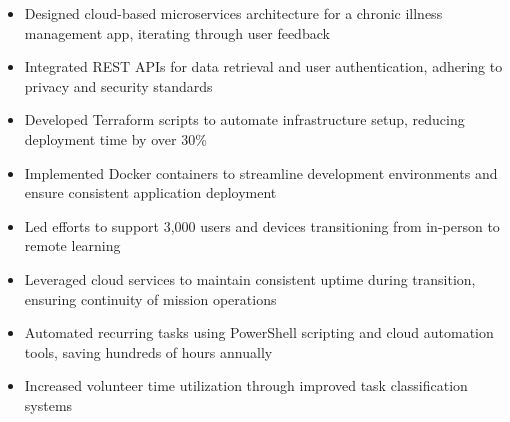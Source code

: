 \par\smallskip
\begin{minipage}{13.75cm}
  \begin{minipage}{6.5cm}
    \begin{itemize}
      \item Designed cloud-based microservices architecture for a chronic illness management app, iterating through user feedback
      \item Integrated REST APIs for data retrieval and user authentication, adhering to privacy and security standards
    \end{itemize}
  \end{minipage}
  \hfill
  \begin{minipage}{6.5cm}
    \begin{itemize}
      \item Developed Terraform scripts to automate infrastructure setup, reducing deployment time by over 30\%
      \item Implemented Docker containers to streamline development environments and ensure consistent application deployment
    \end{itemize}
  \end{minipage}
\end{minipage}
\par\smallskip
\divider

\par\smallskip
\begin{minipage}{13.75cm}
  \begin{minipage}{6.5cm}
    \begin{itemize}
      \item Led efforts to support 3,000 users and devices transitioning from in-person to remote learning
      \item Leveraged cloud services to maintain consistent uptime during transition, ensuring continuity of mission operations
    \end{itemize}
  \end{minipage}
  \hfill
  \begin{minipage}{6.5cm}
    \begin{itemize}
      \item Automated recurring tasks using PowerShell scripting and cloud automation tools, saving hundreds of hours annually
      \item Increased volunteer time utilization through improved task classification systems
    \end{itemize}
  \end{minipage}
\end{minipage}

